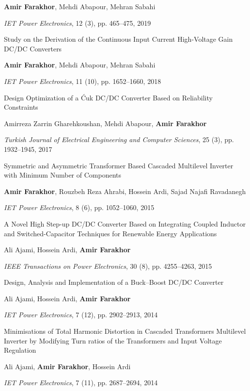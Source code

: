 \documentclass[10pt,letter]{article}
\newcounter{myEnumCounter}
\newcounter{mySaveCounter}
\renewenvironment{enumerate}{%
  \begin{list}{\arabic{myEnumCounter}.}{\usecounter{myEnumCounter}%
  \setcounter{myEnumCounter}{\value{mySaveCounter}}}
  }{%
  \setcounter{mySaveCounter}{\value{myEnumCounter}}\end{list}%
}
\begin{document}
\begin{small}
\begin{enumerate}
\textbf{Amir Farakhor}, Mehdi Abapour, Mehran Sabahi

{\it IET Power Electronics}, 12 (3), pp. 465–475, 2019

    \item 	
Study on the Derivation of the Continuous Input Current High-Voltage Gain DC/DC Converters

\textbf{Amir Farakhor}, Mehdi Abapour, Mehran Sabahi

{\it IET Power Electronics}, 11 (10), pp. 1652–1660, 2018

    \item 	
Design Optimization of a Ćuk DC/DC Converter Based on Reliability Constraints

Amirreza Zarrin Gharehkoushan, Mehdi Abapour, \textbf{Amir Farakhor}

{\it Turkish Journal of Electrical Engineering and Computer Sciences}, 25 (3), pp. 1932–1945, 2017

    \item 	
Symmetric and Asymmetric Transformer Based Cascaded Multilevel Inverter with Minimum Number of Components

\textbf{Amir Farakhor}, Rouzbeh Reza Ahrabi, Hossein Ardi, Sajad Najafi Ravadanegh

{\it IET Power Electronics}, 8 (6), pp. 1052–1060, 2015

    \item 	
A Novel High Step-up DC/DC Converter Based on Integrating Coupled Inductor and Switched-Capacitor Techniques for Renewable Energy Applications

Ali Ajami, Hossein Ardi, \textbf{Amir Farakhor}

{\it IEEE Transactions on Power Electronics}, 30 (8), pp. 4255–4263, 2015

    \item 	
Design, Analysis and Implementation of a Buck–Boost DC/DC Converter

Ali Ajami, Hossein Ardi, \textbf{Amir Farakhor}

{\it IET Power Electronics}, 7 (12), pp. 2902–2913, 2014

    \item 	
Minimisations of Total Harmonic Distortion in Cascaded Transformers Multilevel Inverter by Modifying Turn ratios of the Transformers and Input Voltage Regulation

Ali Ajami, \textbf{Amir Farakhor}, Hossein Ardi

{\it IET Power Electronics}, 7 (11), pp. 2687–2694, 2014


\end{enumerate}
\end{small}
\end{document}
